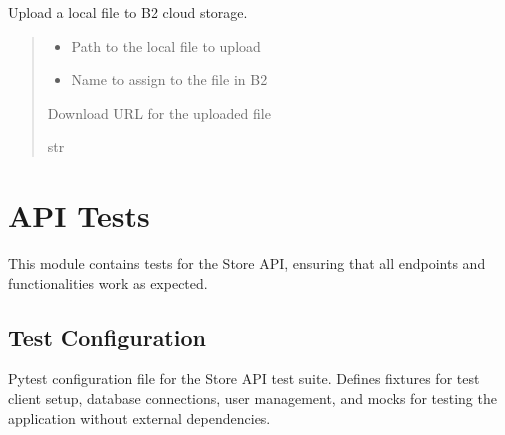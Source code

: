 \documentclass[letterpaper,10pt,openany,oneside,english]{sphinxmanual}
\begin{document}
\begin{savenotes}\begin{fulllineitems}

\pysigstartsignatures
{}
\pysigstopsignatures
\sphinxAtStartPar
Upload a local file to B2 cloud storage.
\begin{quote}\begin{description}
\begin{itemize}
\item {} 
\sphinxAtStartPar
{} \textendash{} Path to the local file to upload

\item {} 
\sphinxAtStartPar
{} \textendash{} Name to assign to the file in B2

\end{itemize}

\sphinxAtStartPar
Download URL for the uploaded file

\sphinxAtStartPar
str

\end{description}\end{quote}

\end{fulllineitems}\end{savenotes}


\sphinxstepscope


\chapter{API Tests}
\label{\detokenize{modules/tests:api-tests}}\label{\detokenize{modules/tests::doc}}
\sphinxAtStartPar
This module contains tests for the Store API, ensuring that all endpoints and functionalities work as expected.


\section{Test Configuration}
\label{\detokenize{modules/tests:module-storeapi.tests.conftest}}\label{\detokenize{modules/tests:test-configuration}}
\sphinxAtStartPar
Pytest configuration file for the Store API test suite.
Defines fixtures for test client setup, database connections, user management,
and mocks for testing the application without external dependencies.
\end{document}

